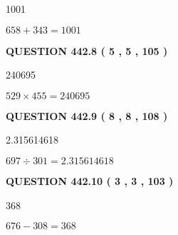 \documentclass{ctexart}
\begin{document}
  
 
 
\noindent{}

1001
 
 
 
 
\noindent{}

$ %
658 +  %
343=   %
1001$
 
 
  
\vspace{0.2in}
  
{\textbf{\Large{QUESTION
442.8 
 ( 5 , 5 , 105 )
}}}
  
  
 
 
\noindent{}

240695
 
 
 
 
\noindent{}

$ %
529 \times  %
455=   %
240695$
 
 
  
\vspace{0.2in}
  
{\textbf{\Large{QUESTION
442.9 
 ( 8 , 8 , 108 )
}}}
  
  
 
 
\noindent{}

2.315614618
 
 
 
 
\noindent{}

$ %
697 \div  %
301=   %
2.315614618$
 
 
  
\vspace{0.2in}
  
{\textbf{\Large{QUESTION
442.10 
 ( 3 , 3 , 103 )
}}}
  
  
 
 
\noindent{}

368
 
 
 
 
\noindent{}

$ %
676 -  %
308=   %
368$
 
\end{document}
